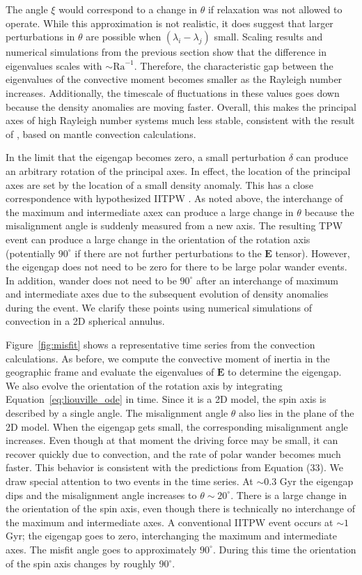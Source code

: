 \documentclass[preprint,12pt,authoryear]{elsarticle}
\begin{document}
The angle $\xi$ would correspond to a change in $\theta$ if relaxation was not allowed to operate. While this approximation is not realistic, it does suggest that larger perturbations in $\theta$ are possible when  $(\lambda_i-\lambda_j)$ small. Scaling results and numerical simulations from the previous section show that the difference in eigenvalues scales with $\sim \mathrm{Ra}^{-1}$.
Therefore, the characteristic gap between the eigenvalues of the convective moment becomes smaller as the Rayleigh number increases.
Additionally, the timescale of fluctuations in these values goes down because the density anomalies are moving faster.
Overall, this makes the principal axes of high Rayleigh number systems much less stable, consistent with the result of \citet{richards1999polar}, based on mantle convection calculations.

In the limit that the eigengap becomes zero, a small perturbation $\delta$ can produce an arbitrary rotation of the principal axes. In effect, the location of the principal axes are set by the location of a small density anomaly. This has a close correspondence with hypothesized IITPW \citep{kirschvink1997evidence}. As noted above, the interchange of the maximum and intermediate axex can produce a large change in $\theta$ because the misalignment angle is suddenly measured from a new axis. The resulting TPW event can produce a large change in the orientation of the rotation axis (potentially $90^{\circ}$ if there are not further perturbations to the $\mathbf{E}$ tensor).  However, the eigengap does not need to be zero for there to be large polar wander events. In addition, wander does not need to be $90^\circ$ after an interchange of maximum and intermediate axes due to the subsequent evolution of density anomalies during the event.  We clarify these points using numerical simulations of convection in a 2D spherical annulus.

Figure~\ref{fig:misfit} shows a representative time series from the convection calculations. As before, we compute the convective moment of inertia in the geographic frame and evaluate the eigenvalues of $\mathbf{E}$ to determine the eigengap. We also evolve the orientation of the rotation axis by integrating  Equation~\eqref{eq:liouville_ode} in time.
Since it is a 2D model, the spin axis is described by a single angle. The misalignment angle $\theta$ also lies in the plane of the 2D model.
When the eigengap gets small,  the corresponding misalignment angle increases.
Even though at that moment the driving force may be small,
it can recover quickly due to convection, and the rate of polar wander becomes much faster.
This behavior is consistent with the predictions from Equation (33). We draw special attention to two events in the time series. At $\sim$0.3 Gyr the eigengap dips and the misalignment angle increases to $\theta \sim 20^{\circ}$. There is a large change in the orientation of the spin axis, even though
there is technically no interchange of the maximum and intermediate axes. A conventional IITPW event occurs at $\sim 1$ Gyr;  the eigengap goes to zero, interchanging the maximum and intermediate axes. The misfit angle goes to approximately $90^\circ$. During this time the orientation of the spin axis changes by roughly 90$^{\circ}$. 
\end{document}
